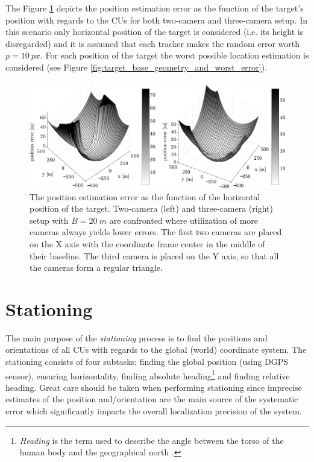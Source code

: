 The Figure \ref{fig:errorMapGivenTargetPosition} depicts the position estimation error as the function of the target's position with regards to the CUs for both two-camera and three-camera setup. In this scenario only horizontal position of the target is considered (i.e. its height is disregarded) and it is assumed that each tracker makes the random error worth $p = 10~px$. For each position of the target the worst possible location estimation is considered (see Figure \ref{fig:target_base_geometry_and_worst_error}).

\begin{figure}[!htb]\centering
	\centering
	\includegraphics[width=0.95\linewidth]{fig/2_vs_3_cus.pdf}
	\caption{The position estimation error as the function of the horizontal position of the target. Two-camera (left) and three-camera (right) setup with $B = 20\ m$ are confronted where utilization of more cameras always yields lower errors. The first two cameras are placed on the X axis with the coordinate frame center in the middle of their baseline. The third camera is placed on the Y axis, so that all the cameras form a regular triangle.} 
	\label{fig:errorMapGivenTargetPosition}
\end{figure}


\section{Stationing} \label{txt:stationing}

The main purpose of the \textit{stationing} process is to find the positions and orientations of all CUs with regards to the global (world) coordinate system. The stationing consists of four subtasks: finding the global position (using DGPS sensor), ensuring horizontality, finding absolute heading\footnote{\textit{Heading} is the term used to describe the angle between the torso of the human body and the geographical north \cite{Henriksson648760}.} and finding relative heading. Great care should be taken when performing stationing since imprecise estimates of the position and/orientation are the main source of the systematic error which significantly impacts the overall localization precision of the system.

